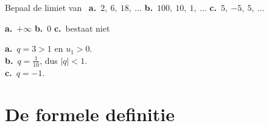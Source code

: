\begin{oefeningen}
\begin{oefening}
Bepaal de limiet van \ \textbf{a.}~$2,\ 6,\ 18,\ \ldots$ \quad \textbf{b.}~$100,\ 10,\ 1,\ \ldots$ \quad \textbf{c.}~$5,\ {-5},\ 5,\ \ldots$
\begin{solution}
\textbf{a.}~$+\infty$ \quad \textbf{b.}~0 \quad \textbf{c.}~bestaat niet
\end{solution}
\begin{fullsolution}
\textbf{a.}~$q=3>1$ en $u_1>0$.\\
\textbf{b.}~$q=\tfrac{1}{10}$, dus $|q|<1$.\\
\textbf{c.}~$q=-1$.
\end{fullsolution}
\end{oefening}
\end{oefeningen}

\section{De formele definitie}

